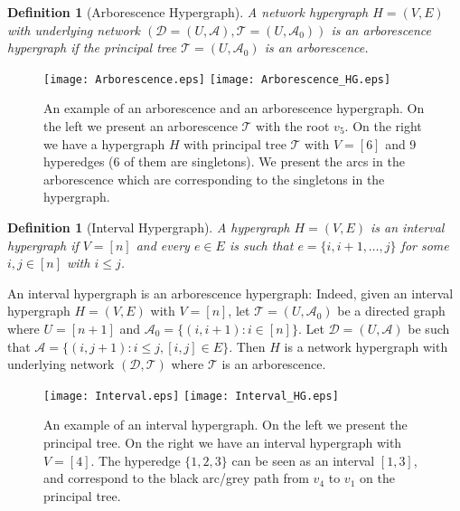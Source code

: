 \documentclass[11pt]{article}
\newtheorem{definition}[theorem]{Definition}
\begin{document}
\begin{definition}[Arborescence Hypergraph]\label{def:Arb-HG}
    A network hypergraph $H=(V,E)$ with underlying network $(\mathcal{D}=(U,\mathcal{A}),\mathcal{T}=(U,\mathcal{A}_0))$ is an \emph{arborescence hypergraph} if the principal tree $\mathcal{T}=(U,\mathcal{A}_0)$ is an arborescence. 
\end{definition}



\begin{figure}[h!]
    \centering
    \texttt{[image: Arborescence.eps]}
    \hspace{1.5cm}
    \texttt{[image: Arborescence\_HG.eps]}
    \caption{An example of an arborescence and an arborescence hypergraph. On the left we present an arborescence $\mathcal{T}$ with the root $v_5$. On the right we have a hypergraph $H$ with principal tree $\mathcal{T}$ with $V=[6]$ and 9 hyperedges (6 of them are singletons). We present the arcs in the arborescence which are corresponding to the singletons in the hypergraph.}
    \label{fig:Arborescence_HG}
\end{figure}




\begin{definition}[Interval Hypergraph]
    A hypergraph $H=(V,E)$ is an \emph{interval hypergraph} if $V=[n]$ and every $e\in E$ is such that $e=\{i, i+1, \ldots,j\}$ for some $i,j\in[n]$ with $i\le j$.
\end{definition}

An interval hypergraph is an arborescence hypergraph: Indeed, given an interval hypergraph $H=(V,E)$ with $V=[n]$, let $\mathcal{T}=(U,\mathcal{A}_0)$ be a directed graph where $U=[n+1]$ and $\mathcal{A}_0=\{(i,i+1):i\in[n]\}$. Let $\mathcal{D}=(U,\mathcal{A})$ be such that $\mathcal{A}=\{(i,j+1):i\le j,[i,j]\in E\}$. Then $H$ is a network hypergraph with underlying network $(\mathcal{D},\mathcal{T})$ where $\mathcal{T}$ is an arborescence.





\begin{figure}[h!]
    \centering
    \texttt{[image: Interval.eps]}
    \hspace{1.5cm}
    \texttt{[image: Interval\_HG.eps]}
    \caption{An example of an interval hypergraph. On the left we present the principal tree. On the right we have an interval hypergraph with $V=[4]$. The hyperedge $\{1,2,3\}$ can be seen as an interval $[1,3]$, and correspond to the black arc/grey path from $v_4$ to $v_1$ on the principal tree.}
    \label{fig:Interval_HG}
\end{figure}
\end{document}
